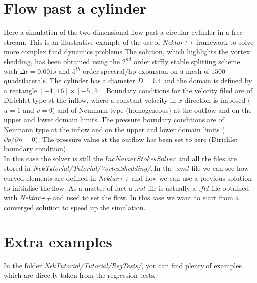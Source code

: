 \documentclass[12pt]{article}
\begin{document}
\section{Flow past a cylinder}
Here a simulation of the two-dimensional flow past a circular cylinder in
a free stream.
This is an illustrative example of the use of \emph{Nektar++}
framework to solve more complex fluid dynamics problems
The solution, which highlights the vortex shedding, has been obtained using the $2^{nd}$
order stiffly stable splitting scheme with $\Delta t = 0.001 s$ and
$5^{th}$ order spectral/hp expansion on a mesh of $1500$
quadrilaterals. The cylinder has a diameter $D = 0.4$ and the domain
is defined by a rectangle $[-4\,,16] \times
[-5\,,5]$. Boundary conditions for the velocity filed
are of Dirichlet type at the inflow, where a constant velocity in
$x$-direction is imposed ($u = 1$ and $v = 0$) and of Neumann type
(homogeneous) at the outflow and on the upper and lower domain
limits. The pressure boundary conditions are of Neumann type at the inflow and on the upper and lower domain limits ($\partial p/\partial n = 0$). The pressure
value at the outflow has been set to zero (Dirichlet boundary  condition).\\

\noindent
In this case the solver is still the $IncNavierStokesSolver$ and all the files are stored in \emph{NekTutorial/Tutorial/VortexShedding/}.
In the $.xml$ file we can see how curved elements are defined in \emph{Nektar++} and how we can use a previous solution to initialise the flow.
As a matter of fact a $.rst$ file is actually a $.fld$ file obtained with \emph{Nektar++} and used to set the flow. In this case we want to start from a converged solution to speed
up the simulation.

\section{Extra examples}

In the folder \emph{NekTutorial/Tutorial/RegTests/}, you can find plenty of examples which are directly taken from the regression tests.
\end{document}
